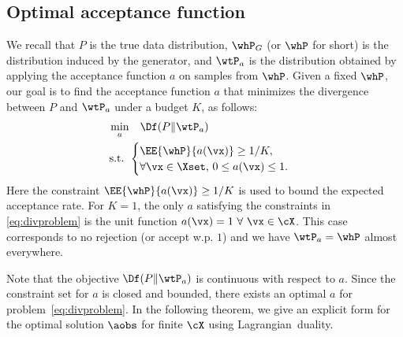\documentclass[twoside]{article}
\begin{document}
\subsection{Optimal acceptance function}

We recall that $P$ is the true data distribution, $\whP_G$ (or $\whP$ for short) is the distribution induced by the generator, and $\wtP_a$ is the distribution obtained by applying the acceptance function $a$ on samples from $\whP$. Given a fixed $\whP$, our goal is to find the acceptance function $a$ that minimizes the  divergence between $P$ and $\wtP_a$ under a budget $K$, as follows: 
\begin{align}
\begin{split}\label{eq:divproblem}
        \min_a &\quad\Df(P\Vert \wtP_a) \\
        \mbox{s.t. } & \begin{cases}\EE{\whP}{a(\vx)} \geq 1/K, \\
        \forall \vx \in\Xset, \, 0\leq a(\vx)\leq 1. \end{cases}
\end{split}
\end{align}
Here the constraint $\EE{\whP}{a(\vx)} \geq 1/K$ is used to bound the expected acceptance rate. For $K=1$, the only $a$ satisfying the constraints in \eqref{eq:divproblem} is the unit function $a(\vx)=1 \ \forall\ \vx\in \cX$. This case corresponds to no rejection (or accept w.p. $1$) and we have $\wtP_a = \whP$ almost everywhere.

Note that the objective $\Df(P\Vert \wtP_a)$ is continuous with respect to $a$. Since the constraint set for $a$ is closed and bounded, there exists an optimal $a$ for problem~\eqref{eq:divproblem}. In the following theorem, we give an explicit form for the optimal solution $\aobs$ for finite $\cX$ using Lagrangian~duality.
\end{document}
